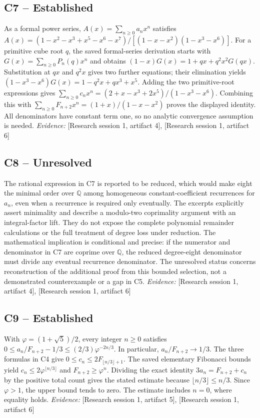 \documentclass[11pt]{article}
\begin{document}
\begin{sloppypar}
\subsection{C7 -- Established}
As a formal power series, $A(x)=\sum_{n\geq 0}a_nx^n$ satisfies $A(x)=(1-x^2-x^3+x^5-x^6-x^7)/[(1-x-x^2)(1-x^3-x^6)]$.
For a primitive cube root $q$, the saved formal-series derivation starts with $G(x)=\sum_{n\geq 0}P_n(q)x^n$ and obtains $(1-x)G(x)=1+qx+q^2x^2G(qx)$. Substitution at $qx$ and $q^2x$ gives two further equations; their elimination yields $(1-x^3-x^6)G(x)=1-q^2x+qx^3+x^5$. Adding the two primitive-root expressions gives $\sum_{n\geq 0}c_nx^n=(2+x-x^3+2x^5)/(1-x^3-x^6)$. Combining this with $\sum_{n\geq 0}F_{n+2}x^n=(1+x)/(1-x-x^2)$ proves the displayed identity. All denominators have constant term one, so no analytic convergence assumption is needed.
\textit{Evidence: }[Research session 1, artifact 4], [Research session 1, artifact 6]
\subsection{C8 -- Unresolved}
The rational expression in C7 is reported to be reduced, which would make eight the minimal order over $\mathbb{Q}$ among homogeneous constant-coefficient recurrences for $a_n$, even when a recurrence is required only eventually.
The excerpts explicitly assert minimality and describe a modulo-two coprimality argument with an integral-factor lift. They do not expose the complete polynomial remainder calculations or the full treatment of degree loss under reduction. The mathematical implication is conditional and precise: if the numerator and denominator in C7 are coprime over $\mathbb{Q}$, the reduced degree-eight denominator must divide any eventual recurrence denominator. The unresolved status concerns reconstruction of the additional proof from this bounded selection, not a demonstrated counterexample or a gap in C5.
\textit{Evidence: }[Research session 1, artifact 4], [Research session 1, artifact 6]
\subsection{C9 -- Established}
With $\varphi=(1+\sqrt{5})/2$, every integer $n\geq 0$ satisfies $0\leq a_n/F_{n+2}-1/3\leq (2/3)\varphi^{-2n/3}$. In particular, $a_n/F_{n+2}\to 1/3$.
The three formulas in C4 give $0\leq c_n\leq 2F_{\lfloor n/3\rfloor+1}$. The saved elementary Fibonacci bounds yield $c_n\leq 2\varphi^{\lfloor n/3\rfloor}$ and $F_{n+2}\geq\varphi^n$. Dividing the exact identity $3a_n=F_{n+2}+c_n$ by the positive total count gives the stated estimate because $\lfloor n/3\rfloor\leq n/3$. Since $\varphi>1$, the upper bound tends to zero. The estimate includes $n=0$, where equality holds.
\textit{Evidence: }[Research session 1, artifact 5], [Research session 1, artifact 6]

\end{sloppypar}
\end{document}

